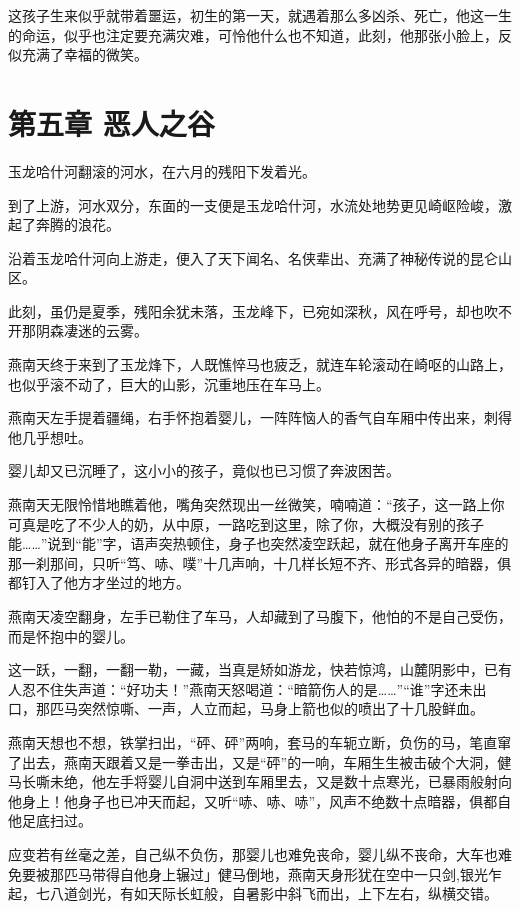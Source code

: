 \documentclass[12pt,oneside]{book}
\begin{document}
这孩子生来似乎就带着噩运，初生的第一天，就遇着那么多凶杀、死亡，他这一生的命运，似乎也注定要充满灾难，可怜他什么也不知道，此刻，他那张小脸上，反似充满了幸福的微笑。

\hypertarget{ux7b2cux4e94ux7ae0-ux6076ux4ebaux4e4bux8c37}{%
\chapter{第五章
恶人之谷}\label{ux7b2cux4e94ux7ae0-ux6076ux4ebaux4e4bux8c37}}

玉龙哈什河翻滚的河水，在六月的残阳下发着光。

到了上游，河水双分，东面的一支便是玉龙哈什河，水流处地势更见崎岖险峻，激起了奔腾的浪花。

沿着玉龙哈什河向上游走，便入了天下闻名、名侠辈出、充满了神秘传说的昆仑山区。

此刻，虽仍是夏季，残阳余犹未落，玉龙峰下，已宛如深秋，风在呼号，却也吹不开那阴森凄迷的云雾。

燕南天终于来到了玉龙烽下，人既憔悴马也疲乏，就连车轮滚动在崎呕的山路上，也似乎滚不动了，巨大的山影，沉重地压在车马上。

燕南天左手提着疆绳，右手怀抱着婴儿，一阵阵恼人的香气自车厢中传出来，刺得他几乎想吐。

婴儿却又已沉睡了，这小小的孩子，竟似也已习惯了奔波困苦。

燕南天无限怜惜地瞧着他，嘴角突然现出一丝微笑，喃喃道：``孩子，这一路上你可真是吃了不少人的奶，从中原，一路吃到这里，除了你，大概没有别的孩子能\ldots\ldots{}''说到``能''字，语声突热顿住，身子也突然凌空跃起，就在他身子离开车座的那一刹那间，只听``笃、哧、噗''十几声响，十几样长短不齐、形式各异的暗器，俱都钉入了他方才坐过的地方。

燕南天凌空翻身，左手已勒住了车马，人却藏到了马腹下，他怕的不是自己受伤，而是怀抱中的婴儿。

这一跃，一翻，一翻一勒，一藏，当真是矫如游龙，快若惊鸿，山麓阴影中，已有人忍不住失声道：``好功夫！''燕南天怒喝道：``暗箭伤人的是\ldots\ldots{}''``谁''字还未出口，那匹马突然惊嘶、一声，人立而起，马身上箭也似的喷出了十几股鲜血。

燕南天想也不想，铁掌扫出，``砰、砰''两响，套马的车轭立断，负伤的马，笔直窜了出去，燕南天跟着又是一拳击出，又是``砰''的一响，车厢生生被击破个大洞，健马长嘶未绝，他左手将婴儿自洞中送到车厢里去，又是数十点寒光，已暴雨般射向他身上！他身子也已冲天而起，又听``哧、哧、哧''，风声不绝数十点暗器，俱都自他足底扫过。

应变若有丝毫之差，自己纵不负伤，那婴儿也难免丧命，婴儿纵不丧命，大车也难免要被那匹马带得自他身上辗过」健马倒地，燕南天身形犹在空中一只剑,银光乍起，七八道剑光，有如天际长虹般，自暑影中斜飞而出，上下左右，纵横交错。
\end{document}
